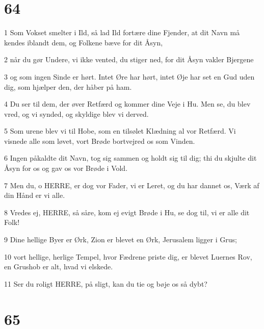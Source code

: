 \chapter{64}

\par 1 Som Vokset smelter i Ild, så lad Ild fortære dine Fjender, at dit Navn må kendes iblandt dem, og Folkene bæve for dit Åsyn,
\par 2 når du gør Undere, vi ikke vented, du stiger ned, for dit Åsyn vakler Bjergene
\par 3 og som ingen Sinde er hørt. Intet Øre har hørt, intet Øje har set en Gud uden dig, som hjælper den, der håber på ham.
\par 4 Du ser til dem, der øver Retfærd og kommer dine Veje i Hu. Men se, du blev vred, og vi synded, og skyldige blev vi derved.
\par 5 Som urene blev vi til Hobe, som en tilsølet Klædning al vor Retfærd. Vi visnede alle som løvet, vort Brøde bortvejred os som Vinden.
\par 6 Ingen påkaldte dit Navn, tog sig sammen og holdt sig til dig; thi du skjulte dit Åsyn for os og gav os vor Brøde i Vold.
\par 7 Men du, o HERRE, er dog vor Fader, vi er Leret, og du har dannet os, Værk af din Hånd er vi alle.
\par 8 Vredes ej, HERRE, så såre, kom ej evigt Brøde i Hu, se dog til, vi er alle dit Folk!
\par 9 Dine hellige Byer er Ørk, Zion er blevet en Ørk, Jerusalem ligger i Grus;
\par 10 vort hellige, herlige Tempel, hvor Fædrene priste dig, er blevet Luernes Rov, en Grushob er alt, hvad vi elskede.
\par 11 Ser du roligt HERRE, på sligt, kan du tie og bøje os så dybt?

\chapter{65}

